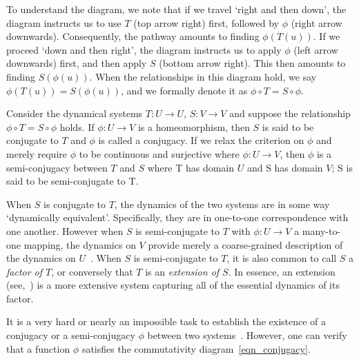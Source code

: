 To understand the diagram, we note that if we travel `right and then down', the diagram instructs us to use $T$ (top arrow right) first, followed by $\phi$ (right arrow downwards). Consequently, the pathway amounts to finding $\phi(T(u))$. If we proceed `down and then right', the diagram instructs us to apply $\phi$ (left arrow downwards) first, and then apply $S$ (bottom arrow right). This then amounts to finding  $S(\phi(u))$. When the relationships in this diagram hold, we say $\phi(T(u))= S(\phi(u))$, and we formally denote it as $\phi \circ T=S\circ \phi$.

\begin{Definition}
  \label{Dfn_Conjugate}\rm
   Consider the dynamical systems $T:U\to{U}$, $S:V\to{V}$ and suppose the relationship $\phi \circ T=S\circ \phi$ holds. If $\phi:U\to{V}$ is a homeomorphism, then $S$ is said to be conjugate to $T$ and $\phi$ is called a conjugacy. If we relax the criterion on $\phi$ and merely require $\phi$ to be continuous and surjective where $\phi:U\to{V}$, then $\phi$ is a semi-conjugacy between $T$ and $S$ where T has domain $U$ and S has domain $V$; S is said to be semi-conjugate to T. 
\end{Definition} 

When $S$ is conjugate to $T$, the dynamics of the two systems are in some way `dynamically equivalent'. Specifically, they are in one-to-one correspondence with one another. However when $S$ is semi-conjugate to $T$ with $\phi:U\to{V}$ a many-to-one mapping, the dynamics on $V$ provide merely a coarse-grained description of the dynamics on $U$~\cite{de2013elements}. When $S$ is semi-conjugate to $T$, it is also common to call $S$ a \emph{factor of $T$}, or conversely that $T$ is an \emph{extension of $S$}. In essence, an extension (see,~\cite{de2013elements}) is a more extensive system capturing all of the essential dynamics of its factor.

It is a very hard or nearly an impossible task to establish the existence of a conjugacy or a semi-conjugacy $\phi$ between two systems~\cite{devaney2018introduction}. However, one can verify that a function $\phi$ satisfies the commutativity diagram~\ref{eqn_conjugacy}.  

